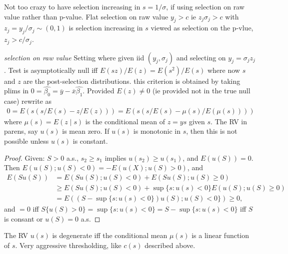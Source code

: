 \documentclass{article}
\newcommand{\E}{E}
\begin{document}
\begin{enumerate}
  Not too crazy to have selection increasing in $s=1/\sigma$, if using
  selection on raw value rather than p-value. Flat selection on raw
  value $y_j>c$ ie $z_j\sigma_j>c$ with $z_j=y_j/\sigma_j\sim (0,1)$ is
  selection increasing in $s$ viewed as selection on the p-vlue,
  $z_j>c/\sigma_j$.

  \emph{selection on raw value} Setting where given iid $(y_j,\sigma_j)$ and selecting on
  $y_j=\sigma_jz_j$. Test is asymptotically null iff
  $E(sz)/E(z)=E(s^2)/E(s)$ where now $s$ and $z$ are the post-selection
  distributions. this criterion is obtained by taking plims in
  $0=\hat{\beta_0}=\overline{y}-\overline{x}\hat{\beta_1}$. Provided
  $E(z)\neq 0$ (ie provided not in the true null case) rewrite as
  \begin{align}
    0=\E\left( s(s / \E(s) - z/\E(z))\right)=\E\left( s(s/\E(s) - \mu(s)/\E(\mu(s)))\right)
  \end{align}
  where $\mu(s)=E(z\mid s)$ is the conditional mean of $z=ys$ given $s$.
  The RV in parens, say $u(s)$ is mean zero. If $u(s)$ is monotonic in $s$, then this is not possible
  unless $u(s)$ is constant.
  \begin{proof}
    Given: $S>0$ a.s., $s_2\ge s_1$ implies $u(s_2)\ge u(s_1)$, and $E(u(S))=0$. Then $\E(u(S); u(S)<0) = -\E(u(X); u(S)>0)$, and
    \begin{align}
      \E(Su(S)) &= \E(Su(S); u(S)<0) + \E(Su(S); u(S)\ge 0)\\
                &\ge \E(Su(S); u(S)<0) + \sup\{s: u(s)<0\}\E(u(S);u(S)\ge 0)\\
                &= \E\left((S-\sup\{s: u(s)<0\})u(S); u(S)<0\}\right) \ge 0,
    \end{align}
    and $=0$ iff $S\{u(S)>0\}=\sup\{s:u(s)<0\}=S-\sup\{s:u(s)<0\}$ iff $S$ is consant or $u(S)=0$ a.s.
  \end{proof}
  The RV $u(s)$ is degenerate iff the conditional mean $\mu(s)$ is a
  linear function of $s$. Very aggressive thresholding, like
  $c(s)$ described above.%


\end{enumerate}
\end{document}
